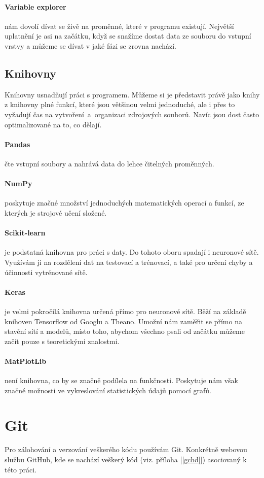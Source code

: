 \documentclass[12pt,a4paper]{report}
\begin{document}
		\paragraph{Variable explorer}
		nám dovolí dívat se živě na proměnné, které v programu existují. Největší uplatnění je asi na začátku, když se snažíme dostat data ze souboru do vstupní vrstvy a můžeme se dívat v jaké fázi se zrovna nachází.
		\subsection{Knihovny}
		Knihovny usnadňují práci s programem. Můžeme si je představit právě jako knihy z knihovny plné funkcí, které jsou většinou velmi jednoduché, ale i přes to vyžadují čas na vytvoření~a~organizaci zdrojových souborů. Navíc jsou dost často optimalizované na to, co dělají.
			\paragraph{Pandas}
			čte vstupní soubory a nahrává data do lehce čitelných proměnných.
			\paragraph{NumPy}
			poskytuje značné množství jednoduchých matematických operací a funkcí, ze kterých je strojové učení složené.
			\paragraph{Scikit-learn}
			je podstatná knihovna pro práci s daty. Do tohoto oboru spadají i neuronové sítě. Využívám ji na rozdělení dat na testovací a trénovací, a také pro určení chyby a účinnosti vytrénované sítě.
			\paragraph{Keras}
			je velmi pokročilá knihovna určená přímo pro neuronové sítě. Běží na základě knihoven Tensorflow od Googlu a Theano. Umožní nám zaměřit se přímo na stavění sítí a modelů, místo toho, abychom všechno psali od začátku můžeme začít pouze s teoretickými znalostmi.
			\paragraph{MatPlotLib}
			není knihovna, co by se značně podílela na funkčnosti. Poskytuje nám však značné možnosti ve vykreslování statistických údajů pomocí grafů.
	\section{Git}
		Pro zálohování a verzování veškerého kódu používám Git. Konkrétně webovou službu GitHub, kde se nachází veškerý kód (viz. příloha [\ref{gchd}]) asociovaný k této práci.
		
\end{document}
